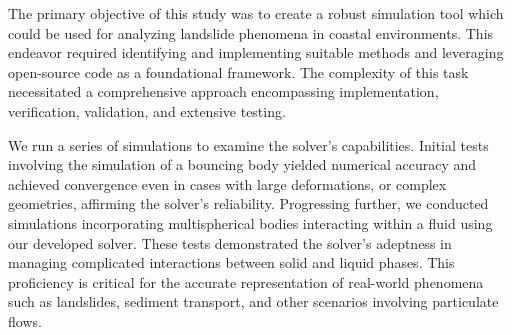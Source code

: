 
The primary objective of this study was to create a robust simulation tool which could be used for analyzing landslide phenomena in coastal environments. This endeavor required identifying and implementing suitable methods and leveraging open-source code as a foundational framework. The complexity of this task necessitated a comprehensive approach encompassing implementation, verification, validation, and extensive testing.

We run a series of simulations to examine the solver's capabilities. Initial tests involving the simulation of a bouncing body yielded numerical accuracy and achieved convergence even in cases with large deformations, or complex geometries, affirming the solver's reliability. Progressing further, we conducted simulations incorporating multispherical bodies interacting within a fluid using our developed solver. These tests demonstrated the solver's adeptness in managing complicated interactions between solid and liquid phases. This proficiency is critical for the accurate representation of real-world phenomena such as landslides, sediment transport, and other scenarios involving particulate flows.

